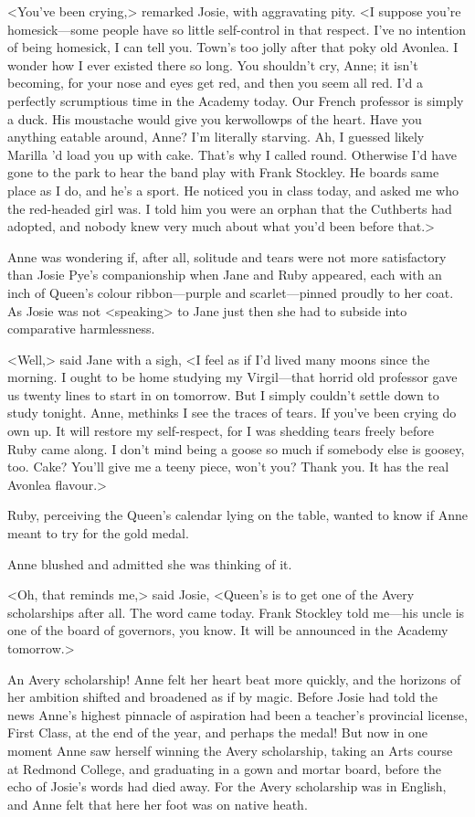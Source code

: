 <You've been crying,> remarked Josie, with aggravating pity. <I suppose you're homesick—some people have so little self-control in that respect. I've no intention of being homesick, I can tell you. Town's too jolly after that poky old Avonlea. I wonder how I ever existed there so long. You shouldn't cry, Anne; it isn't becoming, for your nose and eyes get red, and then you seem all red. I'd a perfectly scrumptious time in the Academy today. Our French professor is simply a duck. His moustache would give you kerwollowps of the heart. Have you anything eatable around, Anne? I'm literally starving. Ah, I guessed likely Marilla 'd load you up with cake. That's why I called round. Otherwise I'd have gone to the park to hear the band play with Frank Stockley. He boards same place as I do, and he's a sport. He noticed you in class today, and asked me who the red-headed girl was. I told him you were an orphan that the Cuthberts had adopted, and nobody knew very much about what you'd been before that.>

Anne was wondering if, after all, solitude and tears were not more satisfactory than Josie Pye's companionship when Jane and Ruby appeared, each with an inch of Queen's colour ribbon—purple and scarlet—pinned proudly to her coat. As Josie was not <speaking> to Jane just then she had to subside into comparative harmlessness.

<Well,> said Jane with a sigh, <I feel as if I'd lived many moons since the morning. I ought to be home studying my Virgil—that horrid old professor gave us twenty lines to start in on tomorrow. But I simply couldn't settle down to study tonight. Anne, methinks I see the traces of tears. If you've been crying do own up. It will restore my self-respect, for I was shedding tears freely before Ruby came along. I don't mind being a goose so much if somebody else is goosey, too. Cake? You'll give me a teeny piece, won't you? Thank you. It has the real Avonlea flavour.>

Ruby, perceiving the Queen's calendar lying on the table, wanted to know if Anne meant to try for the gold medal.

Anne blushed and admitted she was thinking of it.

<Oh, that reminds me,> said Josie, <Queen's is to get one of the Avery scholarships after all. The word came today. Frank Stockley told me—his uncle is one of the board of governors, you know. It will be announced in the Academy tomorrow.>

An Avery scholarship! Anne felt her heart beat more quickly, and the horizons of her ambition shifted and broadened as if by magic. Before Josie had told the news Anne's highest pinnacle of aspiration had been a teacher's provincial license, First Class, at the end of the year, and perhaps the medal! But now in one moment Anne saw herself winning the Avery scholarship, taking an Arts course at Redmond College, and graduating in a gown and mortar board, before the echo of Josie's words had died away. For the Avery scholarship was in English, and Anne felt that here her foot was on native heath.


